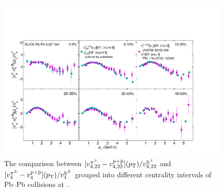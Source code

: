 

\begin{figure}[!htb]
\begin{center}
\includegraphics[scale=0.6]{figures/results/massOrdering_vn_pion_proton_to_charged.pdf}
\end{center}
\caption{The comparison between $[v_{4,22}^{\pi^{\pm}} -  v_{4,22}^{\rm p+\bar{p}}](p_{\rm T}) / v_{4,22}^{\rm h^{\pm}} $ and $[v_{4}^{\pi^{\pm}} -  v_{4}^{\rm p+\bar{p}}](p_{\rm T}) / v_{4}^{\rm h^{\pm}} $  grouped into different centrality intervals of Pb--Pb collisions at \sNN.}
\label{massOrderingComparison}
\end{figure}



\newpage

